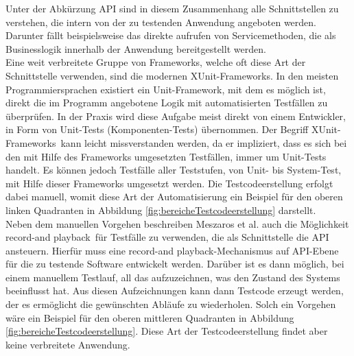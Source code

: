 Unter der Abkürzung API sind in diesem Zusammenhang alle Schnittstellen zu verstehen, die intern von der zu testenden Anwendung angeboten werden. Darunter fällt beispielsweise das direkte aufrufen von Servicemethoden, die als Businesslogik innerhalb der Anwendung bereitgestellt werden.\\
Eine weit verbreitete Gruppe von Frameworks, welche oft diese Art der Schnittstelle verwenden, sind die modernen \grq XUnit-Frameworks\grq. In den meisten Programmiersprachen existiert ein Unit-Framework, mit dem es möglich ist, direkt die im Programm angebotene Logik mit automatisierten Testfällen zu überprüfen. In der Praxis wird diese Aufgabe meist direkt von einem Entwickler, in Form von Unit-Tests (Komponenten-Tests) übernommen. Der Begriff \grq XUnit-Frameworks\grq\ kann leicht missverstanden werden, da er impliziert, dass es sich bei den mit Hilfe des Frameworks umgesetzten Testfällen, immer um Unit-Tests handelt. Es können jedoch Testfälle aller Teststufen, von Unit- bis System-Test, mit Hilfe dieser Frameworks umgesetzt werden.
Die Testcodeerstellung erfolgt dabei manuell, womit diese Art der Automatisierung ein Beispiel für den oberen linken Quadranten in Abbildung \ref{fig:bereicheTestcodeerstellung} darstellt.\\
Neben dem manuellen Vorgehen beschreiben Meszaros et al. \cite{meszaros_agile_2003} auch die Möglichkeit \grq record-and playback\grq\ für Testfälle zu verwenden, die als Schnittstelle die API ansteuern.
Hierfür muss eine \grq record-and playback\grq-Mechanismus auf API-Ebene für die zu testende Software entwickelt werden. Darüber ist es dann möglich, bei einem manuellem Testlauf, all das aufzuzeichnen, was den Zustand des Systems beeinflusst hat. Aus diesen Aufzeichnungen kann dann Testcode erzeugt werden, der es ermöglicht die gewünschten Abläufe zu wiederholen. Solch ein Vorgehen wäre ein Beispiel für den oberen mittleren Quadranten in Abbildung \ref{fig:bereicheTestcodeerstellung}. Diese Art der Testcodeerstellung findet aber keine verbreitete Anwendung.

